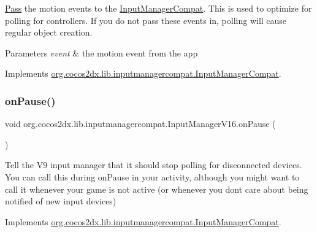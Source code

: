 \hyperlink{classPass}{Pass} the motion events to the \hyperlink{interfaceorg_1_1cocos2dx_1_1lib_1_1inputmanagercompat_1_1InputManagerCompat}{Input\+Manager\+Compat}. This is used to optimize for polling for controllers. If you do not pass these events in, polling will cause regular object creation.


\begin{DoxyParams}{Parameters}
{\em event} & the motion event from the app \\
\hline
\end{DoxyParams}


Implements \hyperlink{interfaceorg_1_1cocos2dx_1_1lib_1_1inputmanagercompat_1_1InputManagerCompat_a813a0308659d716c9503d44ccb48ebb1}{org.\+cocos2dx.\+lib.\+inputmanagercompat.\+Input\+Manager\+Compat}.

\mbox{\label{classorg_1_1cocos2dx_1_1lib_1_1inputmanagercompat_1_1InputManagerV16_a06c3db7d607a8a43c9d27565dd759340}} 
\subsubsection{\texorpdfstring{on\+Pause()}{onPause()}\hspace{0.1cm}{\footnotesize\ttfamily [1/2]}}
{\footnotesize\ttfamily void org.\+cocos2dx.\+lib.\+inputmanagercompat.\+Input\+Manager\+V16.\+on\+Pause (\begin{DoxyParamCaption}{ }\end{DoxyParamCaption})\hspace{0.3cm}{\ttfamily [inline]}}

Tell the V9 input manager that it should stop polling for disconnected devices. You can call this during on\+Pause in your activity, although you might want to call it whenever your game is not active (or whenever you don\textquotesingle{}t care about being notified of new input devices) 

Implements \hyperlink{interfaceorg_1_1cocos2dx_1_1lib_1_1inputmanagercompat_1_1InputManagerCompat_a75e607a2bc756ca935665236f995dd0e}{org.\+cocos2dx.\+lib.\+inputmanagercompat.\+Input\+Manager\+Compat}.

